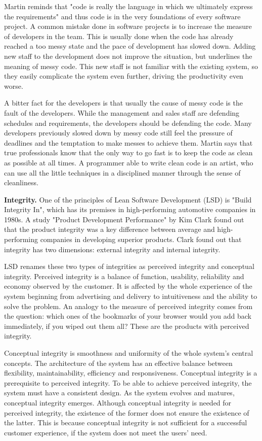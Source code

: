  Martin reminds that "code is really the language in which we ultimately express the requirements" and thus code is in the very foundations of every software project. A common mistake done in software projects is to increase the measure of developers in the team. This is usually done when the code has already reached a too messy state and the pace of development has slowed down. Adding new staff to the development does not improve the situation, but underlines the meaning of messy code. This new staff is not familiar with the existing system, so they easily complicate the system even further, driving the productivity even worse.

 A bitter fact for the developers is that usually the cause of messy code is the fault of the developers. While the management and sales staff are defending schedules and requirements, the developers should be defending the code. Many developers previously slowed down by messy code still feel the pressure of deadlines and the temptation to make messes to achieve them. Martin says that true professionals know that the only way to go fast is to keep the code as clean as possible at all times. A programmer able to write clean code is an artist, who can use all the little techniques in a disciplined manner through the sense of cleanliness.~\cite{martin2008clean}
 
 \textbf{Integrity.} One of the principles of Lean Software Development (LSD) is "Build Integrity In", which has its premises in high-performing automotive companies in 1980s. A study "Product Development Performance" by Kim Clark found out that the product integrity was a key difference between average and high-performing companies in developing superior products. Clark found out that integrity has two dimensions: external integrity and internal integrity.~\cite{clark1991product}

 LSD renames these two types of integrities as perceived integrity and conceptual integrity. Perceived integrity is a balance of function, usability, reliability and economy observed by the customer. It is affected by the whole experience of the system beginning from advertising and delivery to intuitiveness and the ability to solve the problem. An analogy to the measure of perceived integrity comes from the question: which ones of the bookmarks of your browser would you add back immediately, if you wiped out them all? These are the products with perceived integrity. 

 Conceptual integrity is smoothness and uniformity of the whole system's central concepts. The architecture of the system has an effective balance between flexibility, maintainability, efficiency and responsiveness. Conceptual integrity is a prerequisite to perceived integrity. To be able to achieve perceived integrity, the system must have a consistent design. As the system evolves and matures, conceptual integrity emerges. Although conceptual integrity is needed for perceived integrity, the existence of the former does not ensure the existence of the latter. This is because conceptual integrity is not sufficient for a successful customer experience, if the system does not meet the users' need.~\cite{poppendieck2003LSD}

